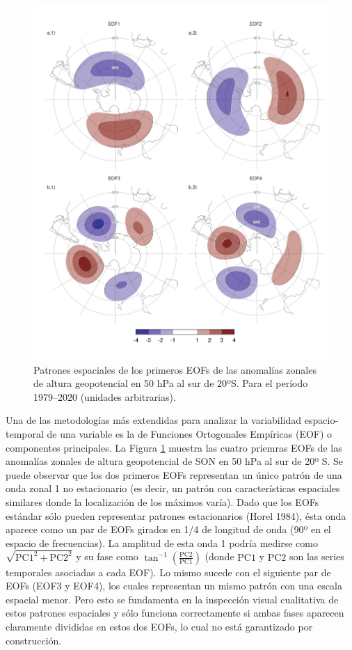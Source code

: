 \documentclass[12pt,oneside,a4paper]{reedthesis}
\begin{document}
\begin{figure}

{\centering \includegraphics{figures/20-ceofs/eof-naive-1} 

}

\caption{Patrones espaciales de los primeros EOFs de las anomalías zonales de altura geopotencial en 50 hPa al sur de 20ºS. Para el período 1979--2020 (unidades arbitrarias).}\label{fig:eof-naive}
\end{figure}

Una de las metodologías más extendidas para analizar la variabilidad espacio-temporal de una variable es la de Funciones Ortogonales Empíricas (EOF) o componentes principales.
La Figura \ref{fig:eof-naive} muestra las cuatro priemras EOFs de las anomalías zonales de altura geopotencial de SON en 50 hPa al sur de 20º S.
Se puede observar que los dos primeros EOFs representan un único patrón de una onda zonal 1 no estacionario (es decir, un patrón con características espaciales similares donde la localización de los máximos varía).
Dado que los EOFs estándar sólo pueden representar patrones estacionarios (Horel 1984), ésta onda aparece como un par de EOFs girados en 1/4 de longitud de onda (90º en el espacio de frecuencias).
La amplitud de esta onda 1 podría medirse como \(\sqrt{\mathrm{PC1}^2 + \mathrm{PC2}^2}\) y su fase como \(\tan^{-1} \left ( \frac{\mathrm{PC2}}{\mathrm{PC1}} \right )\) (donde \(\mathrm{PC1}\) y \(\mathrm{PC2}\) son las series temporales asociadas a cada EOF).
Lo mismo sucede con el siguiente par de EOFs (EOF3 y EOF4), los cuales representan un mismo patrón con una escala espacial menor.
Pero esto se fundamenta en la inspección visual cualitativa de estos patrones espaciales y sólo funciona correctamente si ambas fases aparecen claramente divididas en estos dos EOFs, lo cual no está garantizado por construcción.
\end{document}
